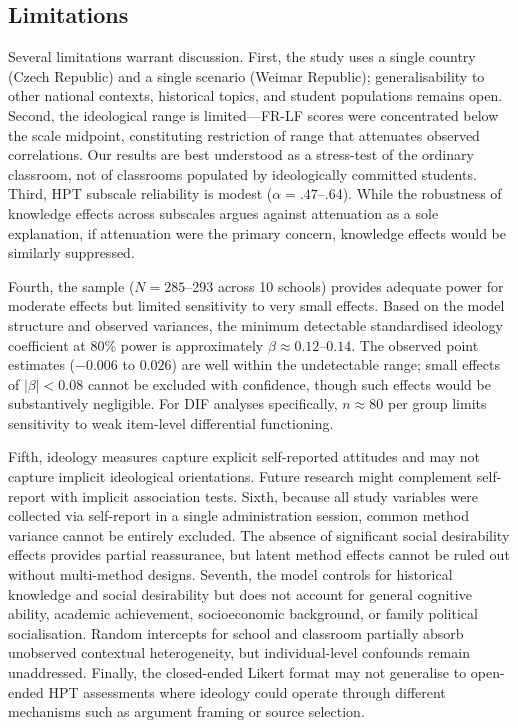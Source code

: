 \documentclass[pdflatex,sn-apa]{sn-jnl}%
\begin{document}
\subsection{Limitations}\label{subsec:limitations}

Several limitations warrant discussion. First, the study uses a single country (Czech Republic) and a single scenario (Weimar Republic); generalisability to other national contexts, historical topics, and student populations remains open. Second, the ideological range is limited---FR-LF scores were concentrated below the scale midpoint, constituting restriction of range that attenuates observed correlations. Our results are best understood as a stress-test of the ordinary classroom, not of classrooms populated by ideologically committed students. Third, HPT subscale reliability is modest ($\alpha = .47$--.64). While the robustness of knowledge effects across subscales argues against attenuation as a sole explanation, if attenuation were the primary concern, knowledge effects would be similarly suppressed.

Fourth, the sample ($N = 285$--293 across 10 schools) provides adequate power for moderate effects but limited sensitivity to very small effects. Based on the model structure and observed variances, the minimum detectable standardised ideology coefficient at 80\% power is approximately $\beta \approx 0.12$--$0.14$. The observed point estimates ($-0.006$ to $0.026$) are well within the undetectable range; small effects of $|\beta| < 0.08$ cannot be excluded with confidence, though such effects would be substantively negligible. For DIF analyses specifically, $n \approx 80$ per group limits sensitivity to weak item-level differential functioning.

Fifth, ideology measures capture explicit self-reported attitudes and may not capture implicit ideological orientations. Future research might complement self-report with implicit association tests. Sixth, because all study variables were collected via self-report in a single administration session, common method variance cannot be entirely excluded. The absence of significant social desirability effects provides partial reassurance, but latent method effects cannot be ruled out without multi-method designs. Seventh, the model controls for historical knowledge and social desirability but does not account for general cognitive ability, academic achievement, socioeconomic background, or family political socialisation. Random intercepts for school and classroom partially absorb unobserved contextual heterogeneity, but individual-level confounds remain unaddressed. Finally, the closed-ended Likert format may not generalise to open-ended HPT assessments where ideology could operate through different mechanisms such as argument framing or source selection.
\end{document}
